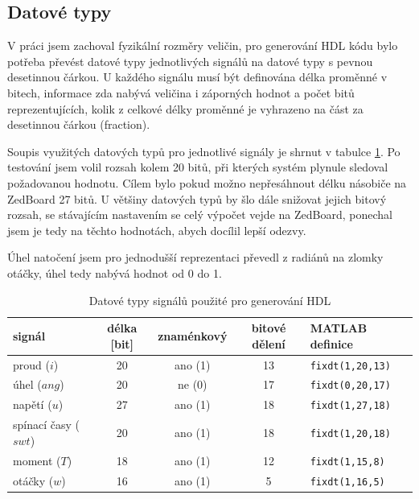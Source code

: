 \subsection{Datové typy}
V práci jsem zachoval fyzikální rozměry veličin, pro generování HDL kódu bylo potřeba převést datové typy jednotlivých signálů na datové typy s pevnou desetinnou čárkou. U každého signálu musí být definována délka proměnné v bitech, informace zda nabývá veličina i záporných hodnot a počet bitů reprezentujících, kolik z celkové délky proměnné je vyhrazeno na část za desetinnou čárkou (fraction).

Soupis využitých datových typů pro jednotlivé signály je shrnut v tabulce \ref{tab:datove_typy}. Po testování jsem volil rozsah kolem 20 bitů, při kterých systém plynule sledoval požadovanou hodnotu. Cílem bylo pokud možno nepřesáhnout délku násobiče na ZedBoard 27 bitů. U většiny datových typů by šlo dále snižovat jejich bitový rozsah, se stávajícím nastavením se celý výpočet vejde na ZedBoard, ponechal jsem je tedy na těchto hodnotách, abych docílil lepší odezvy.

Úhel natočení jsem pro jednodušší reprezentaci převedl z radiánů na zlomky otáčky, úhel tedy nabývá hodnot od 0 do 1.

\begin{table}[h]
    \centering
    \begin{tabular}{|l|c|c|c|l|}
        \hline
        \textbf{signál} & \textbf{délka [bit]} & \textbf{znaménkový} & \textbf{bitové dělení } & \textbf{MATLAB definice} \\ \hline
        proud ($i$)     & 20                  & ano (1)             & 13                                & \texttt{fixdt(1,20,13)} \\ \hline
        úhel ($ang$)    & 20                  & ne (0)              & 17                                & \texttt{fixdt(0,20,17)} \\ \hline
        napětí ($u$)    & 27                  & ano (1)             & 18                                & \texttt{fixdt(1,27,18)} \\ \hline
        spínací časy ($swt$) & 20                  & ano (1)             & 18                                & \texttt{fixdt(1,20,18)} \\ \hline
        moment ($T$)    & 18                  & ano (1)             & 12                                 & \texttt{fixdt(1,15,8)}  \\ \hline
        otáčky ($w$)    & 16                  & ano (1)             & 5                                 & \texttt{fixdt(1,16,5)}  \\ \hline
    \end{tabular}
    \caption{Datové typy signálů použité pro generování HDL}
    \label{tab:datove_typy}
\end{table}


